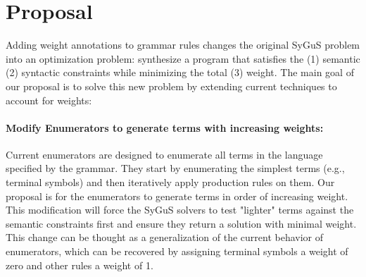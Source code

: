 \section{Proposal}
\label{sec:proposal}
%
Adding weight annotations to grammar rules changes the original SyGuS problem into an optimization problem:
%
synthesize a program that satisfies the (1) semantic (2) syntactic constraints while minimizing the total (3) weight.
%
The main goal of our proposal is to solve this new problem by extending current techniques to account for weights:
%
\paragraph{Modify Enumerators to generate terms with increasing weights:}
%
Current enumerators are designed to enumerate all terms in the language specified by the grammar.
%
They start by enumerating the simplest terms (e.g., terminal symbols) and then iteratively apply production rules on them.
%
Our proposal is for the enumerators to generate terms in order of increasing weight.
%
This modification will force the SyGuS solvers to test "lighter" terms against the semantic constraints first and ensure they return a solution with minimal weight.
%
This change can be thought as a generalization of the current behavior of enumerators, which can be recovered by assigning terminal symbols a weight of zero and other rules a weight of 1.
%
